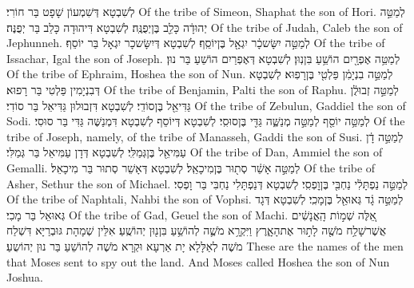 {לְשִׁבְטָא דְּשִׁמְעוֹן שָׁפָט בַּר חוֹרִי׃}
{Of the tribe of Simeon, Shaphat the son of Hori.}{}
{לְמַטֵּ֣ה יְהוּדָ֔ה כָּלֵ֖ב בֶּן\maqqaf יְפֻנֶּֽה׃}
{לְשִׁבְטָא דִּיהוּדָה כָּלֵב בַּר יְפֻנֶּה׃}
{Of the tribe of Judah, Caleb the son of Jephunneh.}{}
{לְמַטֵּ֣ה יִשָּׂשכָ֔ר יִגְאָ֖ל בֶּן\maqqaf יוֹסֵֽף׃}
{לְשִׁבְטָא דְּיִשָּׂשכָר יִגְאָל בַּר יוֹסֵף׃}
{Of the tribe of Issachar, Igal the son of Joseph.}{}
{לְמַטֵּ֥ה אֶפְרָ֖יִם הוֹשֵׁ֥עַ בִּן\maqqaf נֽוּן׃}
{לְשִׁבְטָא דְּאֶפְרַיִם הוֹשֵׁעַ בַּר נוּן׃}
{Of the tribe of Ephraim, Hoshea the son of Nun.}{}
{לְמַטֵּ֣ה בִנְיָמִ֔ן פַּלְטִ֖י בֶּן\maqqaf רָפֽוּא׃}
{לְשִׁבְטָא דְּבִנְיָמִין פַּלְטִי בַּר רָפוּא׃}
{Of the tribe of Benjamin, Palti the son of Raphu.}{}
{לְמַטֵּ֣ה זְבוּלֻ֔ן גַּדִּיאֵ֖ל בֶּן\maqqaf סוֹדִֽי׃}
{לְשִׁבְטָא דִּזְבוּלוּן גַּדִּיאֵל בַּר סוֹדִי׃}
{Of the tribe of Zebulun, Gaddiel the son of Sodi.}{}
{לְמַטֵּ֥ה יוֹסֵ֖ף לְמַטֵּ֣ה מְנַשֶּׁ֑ה גַּדִּ֖י בֶּן\maqqaf סוּסִֽי׃}
{לְשִׁבְטָא דְּיוֹסֵף לְשִׁבְטָא דִּמְנַשֶּׁה גַּדִּי בַּר סוּסִי׃}
{Of the tribe of Joseph, namely, of the tribe of Manasseh, Gaddi the son of Susi.}{}
{לְמַטֵּ֣ה דָ֔ן עַמִּיאֵ֖ל בֶּן\maqqaf גְּמַלִּֽי׃}
{לְשִׁבְטָא דְּדָן עַמִּיאֵל בַּר גְּמַלִּי׃}
{Of the tribe of Dan, Ammiel the son of Gemalli.}{}
{לְמַטֵּ֣ה אָשֵׁ֔ר סְת֖וּר בֶּן\maqqaf מִיכָאֵֽל׃}
{לְשִׁבְטָא דְּאָשֵׁר סְתוּר בַּר מִיכָאֵל׃}
{Of the tribe of Asher, Sethur the son of Michael.}{}
{לְמַטֵּ֣ה נַפְתָּלִ֔י נַחְבִּ֖י בֶּן\maqqaf וׇפְסִֽי׃}
{לְשִׁבְטָא דְּנַפְתָּלִי נַחְבִּי בַּר וָפְסִי׃}
{Of the tribe of Naphtali, Nahbi the son of Vophsi.}{}
{לְמַטֵּ֣ה גָ֔ד גְּאוּאֵ֖ל בֶּן\maqqaf מָכִֽי׃}
{לְשִׁבְטָא דְּגָד גְּאוּאֵל בַּר מָכִי׃}
{Of the tribe of Gad, Geuel the son of Machi.}{}
{אֵ֚לֶּה שְׁמ֣וֹת הָֽאֲנָשִׁ֔ים אֲשֶׁר\maqqaf שָׁלַ֥ח מֹשֶׁ֖ה לָת֣וּר אֶת\maqqaf הָאָ֑רֶץ וַיִּקְרָ֥א מֹשֶׁ֛ה לְהוֹשֵׁ֥עַ בִּן\maqqaf נ֖וּן יְהוֹשֻֽׁעַ׃}
{אִלֵּין שְׁמָהָת גּוּבְרַיָּא דִּשְׁלַח מֹשֶׁה לְאַלָּלָא יָת אַרְעָא וּקְרָא מֹשֶׁה לְהוֹשֵׁעַ בַּר נוּן יְהוֹשֻעַ׃}
{These are the names of the men that Moses sent to spy out the land. And Moses called Hoshea the son of Nun Joshua.}{}

